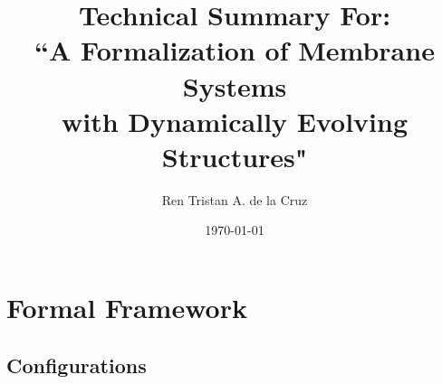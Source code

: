 \documentclass{article}
\title{Technical Summary For: \\ ``A Formalization of Membrane Systems\\ with Dynamically Evolving Structures"}
\date{\today}
\author{Ren Tristan A. de la Cruz}
\begin{document}

\maketitle


\section{Formal Framework}


\subsection{Configurations}

\end{document}
